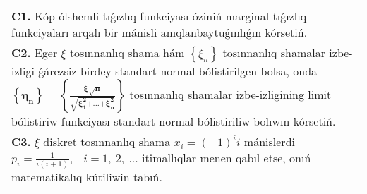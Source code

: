 \documentclass{article}
\begin{document}
\begin{tabular}{m{17cm}}
 \\
\textbf{C1.} Kóp ólshemli tıǵızlıq funkciyası óziniń marginal tıǵızlıq funkciyaları arqalı bir mánisli anıqlanbaytuǵınlıǵın kórsetiń.
 \\
\textbf{C2.} 
Eger \(\xi\) tosınnanlıq shama hám \(\left\{ \xi_{n} \right\}\) tosınnanlıq shamalar izbe-izligi ǵárezsiz birdey standart normal bólistirilgen bolsa, onda \(\left\{ \mathbf{\eta}_{\mathbf{n}} \right\}\mathbf{=}\left\{ \frac{\mathbf{\xi}\sqrt{\mathbf{n}}}{\sqrt{\mathbf{\xi}_{\mathbf{1}}^{\mathbf{2}}\mathbf{+}\mathbf{...}\mathbf{+}\mathbf{\xi}_{\mathbf{n}}^{\mathbf{2}}}} \right\}\) tosınnanlıq shamalar izbe-izligining limit bólistiriw funkciyası standart normal bólistiriliw bolıwın kórsetiń.
 \\
\textbf{C3.} 
\(\xi\) diskret tosınnanlıq shama \(x_{i} = ( - 1)^{i}i\) mánislerdi \(p_{i} = \frac{1}{i(i + 1)},\) \(\ \ i = 1,\ 2,\ ...\) itimallıqlar menen qabıl etse, onıń matematikalıq kútiliwin tabıń.
 \\

\end{tabular}
\vspace{1cm}
\end{document}
